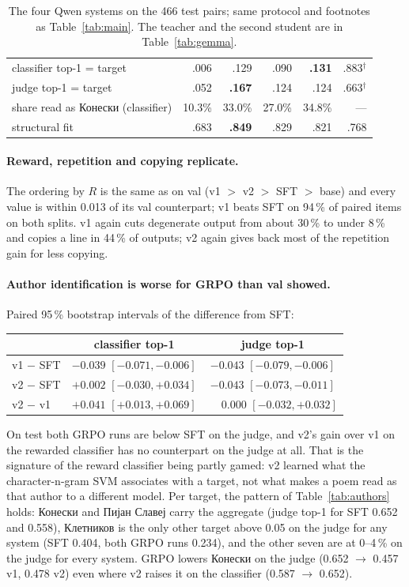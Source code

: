 \documentclass[11pt]{article}
\begin{document}
\begin{table}[ht]
\begin{tabular}{lrrrrr}
\quad classifier top-1 = target             & .006 & .129 & .090 & \textbf{.131} & .883$^\dagger$ \\
\quad judge top-1 = target                  & .052 & \textbf{.167} & .124 & .124 & .663$^\dagger$ \\
\quad share read as Конески (classifier)    & 10.3\% & 33.0\% & 27.0\% & 34.8\% & --- \\
\quad structural fit                        & .683 & \textbf{.849} & .829 & .821 & .768 \\
\bottomrule
\end{tabular}
\caption{The four Qwen systems on the 466 test pairs; same protocol and
footnotes as Table~\ref{tab:main}. The teacher and the second student are in
Table~\ref{tab:gemma}.}
\label{tab:test}
\end{table}

\paragraph{Reward, repetition and copying replicate.} The ordering by $R$ is
the same as on val (v1 $>$ v2 $>$ SFT $>$ base) and every value is within
0.013 of its val counterpart; v1 beats SFT on 94\,\% of paired items on both
splits. v1 again cuts degenerate output from about 30\,\% to under 8\,\% and
copies a line in 44\,\% of outputs; v2 again gives back most of the repetition
gain for less copying.

\paragraph{Author identification is worse for GRPO than val showed.} Paired
95\,\% bootstrap intervals of the difference from SFT:
\begin{center}\small
\begin{tabular}{lcc}
\toprule
& classifier top-1 & judge top-1 \\
\midrule
v1 $-$ SFT & $-0.039$ $[-0.071, -0.006]$ & $-0.043$ $[-0.079, -0.006]$ \\
v2 $-$ SFT & $+0.002$ $[-0.030, +0.034]$ & $-0.043$ $[-0.073, -0.011]$ \\
v2 $-$ v1  & $+0.041$ $[+0.013, +0.069]$ & $\phantom{+}0.000$ $[-0.032, +0.032]$ \\
\bottomrule
\end{tabular}
\end{center}
On test both GRPO runs are below SFT on the judge, and v2's gain over v1 on
the rewarded classifier has no counterpart on the judge at all. That is the
signature of the reward classifier being partly gamed: v2 learned what the
character-n-gram SVM associates with a target, not what makes a poem read as
that author to a different model. Per target, the pattern of
Table~\ref{tab:authors} holds: Конески and Пијан Славеј carry the aggregate
(judge top-1 for SFT 0.652 and 0.558), Клетников is the only other target
above 0.05 on the judge for any system (SFT 0.404, both GRPO runs 0.234), and the other
seven are at 0--4\,\% on the judge for every system. GRPO lowers Конески on
the judge (0.652 $\to$ 0.457 v1, 0.478 v2) even where v2 raises it on the
classifier (0.587 $\to$ 0.652).
\end{document}
